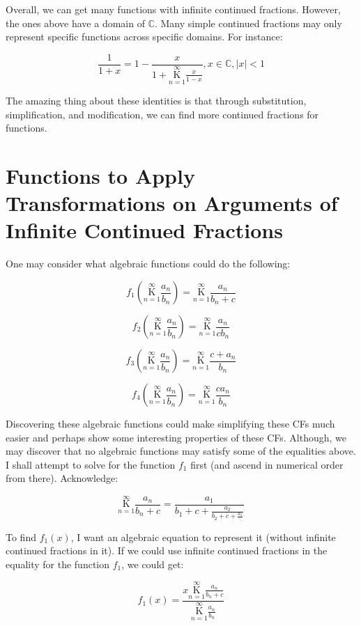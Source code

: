 \documentclass{article}
\begin{document}
Overall, we can get many functions with infinite continued fractions. However, the ones above have a domain of $\mathbb{C}$. Many simple continued fractions may only represent specific functions across specific domains. For instance:

$$\frac{1}{1+x}=1-\frac{x}{1+\underset{n=1}{\overset{\infty}{\mathrm K}} \frac{x}{1-x}},x \in \mathbb{C},|x|<1$$

The amazing thing about these identities is that through substitution, simplification, and modification, we can find more continued fractions for functions.

\section{Functions to Apply Transformations on Arguments of Infinite Continued Fractions}


One may consider what algebraic functions could do the following:

$$f_1(\underset{n=1}{\overset{\infty}{\mathrm K}} \frac{a_n}{b_n})=\underset{n=1}{\overset{\infty}{\mathrm K}} \frac{a_n}{b_n+c}$$

$$f_2(\underset{n=1}{\overset{\infty}{\mathrm K}} \frac{a_n}{b_n})=\underset{n=1}{\overset{\infty}{\mathrm K}} \frac{a_n}{cb_n}$$

$$f_3(\underset{n=1}{\overset{\infty}{\mathrm K}} \frac{a_n}{b_n})=\underset{n=1}{\overset{\infty}{\mathrm K}} \frac{c+a_n}{b_n}$$

$$f_4(\underset{n=1}{\overset{\infty}{\mathrm K}} \frac{a_n}{b_n})=\underset{n=1}{\overset{\infty}{\mathrm K}} \frac{ca_n}{b_n}$$

Discovering these algebraic functions could make simplifying these CFs much easier and perhaps show some interesting properties of these CFs. Although, we may discover that no algebraic functions may satisfy some of the equalities above. I shall attempt to solve for the function $f_1$ first (and ascend in numerical order from there). Acknowledge:

$$\underset{n=1}{\overset{\infty}{\mathrm K}} \frac{a_n}{b_n+c}= \frac{a_1}{b_1+c + \frac{a_2}{b_2+c + \frac{a_3}{\ddots}}}$$

To find $f_1(x)$, I want an algebraic equation to represent it (without infinite continued fractions in it). If we could use infinite continued fractions in the equality for the function $f_1$, we could get:

$$f_1(x)=\frac{x \underset{n=1}{\overset{\infty}{\mathrm K}} \frac{a_n}{b_n+c}}{\underset{n=1}{\overset{\infty}{\mathrm K}} \frac{a_n}{b_n}}$$
\end{document}
